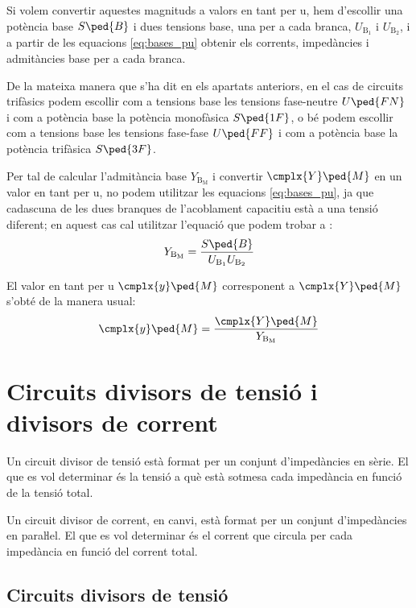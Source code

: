Si volem convertir aquestes magnituds a valors en tant per u, hem d'escollir  una potència base $S\ped{B}$ i dues tensions base, una  per a cada branca, $U_{\text{B}_1}$ i  $U_{\text{B}_2}$, i a partir de les equacions \eqref{eq:bases_pu} obtenir els corrents, impedàncies i admitàncies base per a cada branca.

De la mateixa manera que s'ha dit en els apartats anteriors, en el cas de circuits trifàsics podem escollir com a tensions base les tensions fase-neutre $U\ped{FN}$ i com a potència base la potència  monofàsica $S\ped{1F}$, o bé podem escollir com a tensions base les tensions fase-fase $U\ped{FF}$ i com a potència base la potència trifàsica $S\ped{3F}$.


Per tal de  calcular l'admitància base $Y_{\text{B}_\text{M}}$ i convertir $\cmplx{Y}\ped{M}$ en un valor en tant per u, no podem utilitzar les equacions \eqref{eq:bases_pu}, ja que cadascuna de les dues branques de l'acoblament capacitiu està a una tensió diferent; en aquest cas cal utilitzar l'equació que podem trobar a \cite{TLE}:
\begin{equation}
    Y_{\text{B}_\text{M}} = \frac{S\ped{B}}{U_{\text{B}_1} U_{\text{B}_2}}
\end{equation}

El valor en tant per u $\cmplx{y}\ped{M}$ corresponent a $\cmplx{Y}\ped{M}$ s'obté de la manera usual:
\begin{equation}
    \cmplx{y}\ped{M} = \frac{\cmplx{Y}\ped{M}}{Y_{\text{B}_\text{M}}}
\end{equation}


\section{Circuits divisors de tensió i divisors de corrent}\label{sec:div_tens_corr}

Un circuit divisor de tensió està format per un conjunt
d'impedàncies en sèrie. El que es vol determinar  és  la
tensió a què està sotmesa cada impedància en funció de la tensió total.

Un circuit divisor de corrent, en canvi, està format per un conjunt
d'impedàncies en paraŀlel. El que es vol determinar és el
corrent que circula per cada impedància en funció del corrent
total.

\subsection{Circuits divisors de tensió}\label{sec:circ-div-tens}

